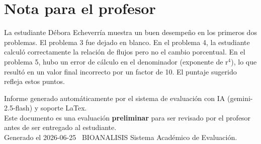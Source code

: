 \documentclass[11pt,a4paper]{article}
\begin{document}
\section*{Nota para el profesor}
\begin{tcolorbox}[
  enhanced, breakable,
  colback=yellow!8, colframe=yellow!60!black,
  fonttitle=\bfseries, coltitle=black,
  title={Observaciones para revisión manual},
  top=4pt, bottom=4pt, left=8pt, right=8pt,
]
La estudiante Débora Echeverría muestra un buen desempeño en los primeros dos problemas. El problema 3 fue dejado en blanco. En el problema 4, la estudiante calculó correctamente la relación de flujos pero no el cambio porcentual. En el problema 5, hubo un error de cálculo en el denominador (exponente de r$^{4}$), lo que resultó en un valor final incorrecto por un factor de 10. El puntaje sugerido refleja estos puntos.
\end{tcolorbox}

\vspace{12pt}
\begin{center}
  \footnotesize\color{gray}
  Informe generado automáticamente por el sistema de evaluación con IA (gemini-2.5-flash) y soporte LaTex. \\
  Este documento es una evaluación \textbf{preliminar} para ser revisado por el profesor antes de ser entregado al 
  estudiante. \\
  Generado el 2026-06-25 \textbullet\ BIOANALISIS Sistema Académico de Evaluación.
  \end{center}
\end{document}
